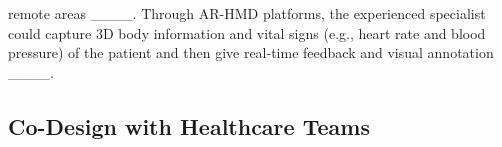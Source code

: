 remote areas ____. Through AR-HMD platforms, the experienced specialist could capture 3D body information and vital signs (e.g., heart rate and blood pressure) of the patient and then give real-time feedback and visual annotation ____.



\subsection{Co-Design with Healthcare Teams}

